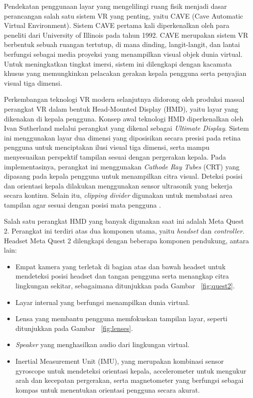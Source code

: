 Pendekatan penggunaan layar yang mengelilingi ruang fisik menjadi dasar perancangan salah satu sistem VR yang penting, yaitu CAVE (Cave Automatic Virtual Environment). Sistem CAVE pertama kali diperkenalkan oleh para peneliti dari University of Illinois pada tahun 1992. CAVE merupakan sistem VR berbentuk sebuah ruangan tertutup, di mana dinding, langit-langit, dan lantai berfungsi sebagai media proyeksi yang menampilkan visual objek dunia virtual. Untuk meningkatkan tingkat imersi, sistem ini dilengkapi dengan kacamata khusus yang memungkinkan pelacakan gerakan kepala pengguna serta penyajian visual tiga dimensi\cite{cruz-neira_cave_1992}.

Perkembangan teknologi VR modern selanjutnya didorong oleh produksi massal perangkat VR dalam bentuk Head-Mounted Display (HMD), yaitu layar yang dikenakan di kepala pengguna. Konsep awal teknologi HMD diperkenalkan oleh Ivan Sutherland melalui perangkat yang dikenal sebagai \textit{Ultimate Display}. Sistem ini menggunakan layar dua dimensi yang diposisikan secara presisi pada retina pengguna untuk menciptakan ilusi visual tiga dimensi, serta mampu menyesuaikan perspektif tampilan sesuai dengan pergerakan kepala. Pada implementasinya, perangkat ini menggunakan \textit{Cathode Ray Tubes} (CRT) yang dipasang pada kepala pengguna untuk menampilkan citra visual. Deteksi posisi dan orientasi kepala dilakukan menggunakan sensor ultrasonik yang bekerja secara kontinu. Selain itu, \textit{clipping divider} digunakan untuk membatasi area tampilan agar sesuai dengan posisi mata pengguna \cite{sutherland_head-mounted_1968}.

Salah satu perangkat HMD yang banyak digunakan saat ini adalah Meta Quest 2. Perangkat ini terdiri atas dua komponen utama, yaitu \textit{headset} dan \textit{controller}. Headset Meta Quest 2 dilengkapi dengan beberapa komponen pendukung, antara lain:

\begin{itemize}
	\item Empat kamera yang terletak di bagian atas dan bawah headset untuk mendeteksi posisi headset dan tangan pengguna serta menangkap citra lingkungan sekitar, sebagaimana ditunjukkan pada Gambar ~\ref{fig:quest2}.
	\item Layar internal yang berfungsi menampilkan dunia virtual.
	\item Lensa yang membantu pengguna memfokuskan tampilan layar, seperti ditunjukkan pada Gambar ~\ref{fig:lenses}.
	\item \textit{Speaker} yang menghasilkan audio dari lingkungan virtual.
	\item Inertial Measurement Unit (IMU), yang merupakan kombinasi sensor gyroscope untuk mendeteksi orientasi kepala, accelerometer untuk mengukur arah dan kecepatan pergerakan, serta magnetometer yang berfungsi sebagai kompas untuk menentukan orientasi pengguna secara akurat.
\end{itemize}


